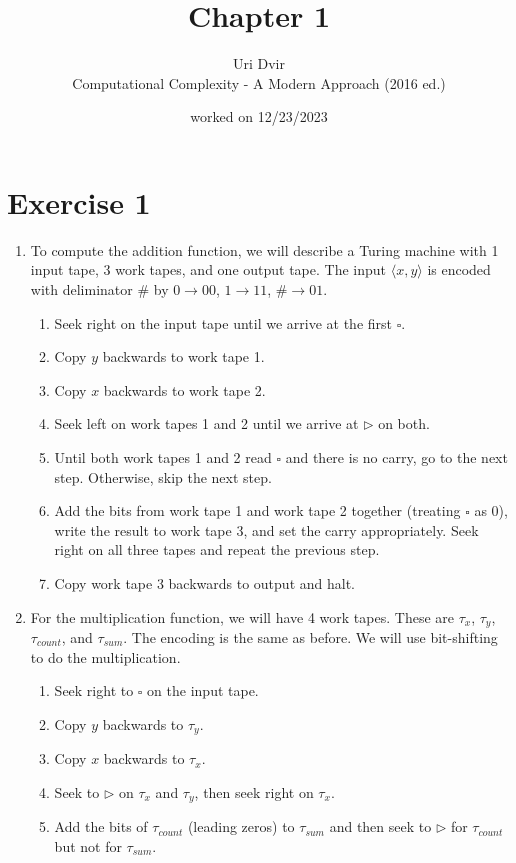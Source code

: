 \documentclass[12pt]{article}
\title{Chapter 1}
\author{Uri Dvir \\ Computational Complexity - A Modern Approach (2016 ed.)}
\date{worked on 12/23/2023}
\begin{document}
\maketitle

\section*{Exercise 1}

\begin{enumerate}
\item{
To compute the addition function, we will describe a Turing machine with 1 input tape, 3 work tapes, and one output tape. The input $\langle x, y \rangle$ is encoded with deliminator $\#$ by $0 \rightarrow 00$, $1 \rightarrow 11$, $\# \rightarrow 01$.
\begin{enumerate}
\item{Seek right on the input tape until we arrive at the first $\square$.}
\item{Copy $y$ backwards to work tape 1.}
\item{Copy $x$ backwards to work tape 2.}
\item{Seek left on work tapes 1 and 2 until we arrive at $\triangleright$ on both.}
\item{Until both work tapes 1 and 2 read $\square$ and there is no carry, go to the next step. Otherwise, skip the next step.}
\item{Add the bits from work tape 1 and work tape 2 together (treating $\square$ as 0), write the result to work tape 3, and set the carry appropriately. Seek right on all three tapes and repeat the previous step.}
\item{Copy work tape 3 backwards to output and halt.}
\end{enumerate}
}
\pagebreak
\item{
For the multiplication function, we will have 4 work tapes. These are $\tau_x$, $\tau_y$, $\tau_{count}$, and $\tau_{sum}$. The encoding is the same as before. We will use bit-shifting to do the multiplication.
\begin{enumerate}
\item{Seek right to $\square$ on the input tape.}
\item{Copy $y$ backwards to $\tau_y$.}
\item{Copy $x$ backwards to $\tau_x$.}
\item{Seek to $\triangleright$ on $\tau_x$ and $\tau_y$, then seek right on $\tau_x$.}
\item{Add the bits of $\tau_{count}$ (leading zeros) to $\tau_{sum}$ and then seek to $\triangleright$ for $\tau_{count}$ but not for $\tau_{sum}$.}

\end{enumerate}}
\end{enumerate}
\end{document}
